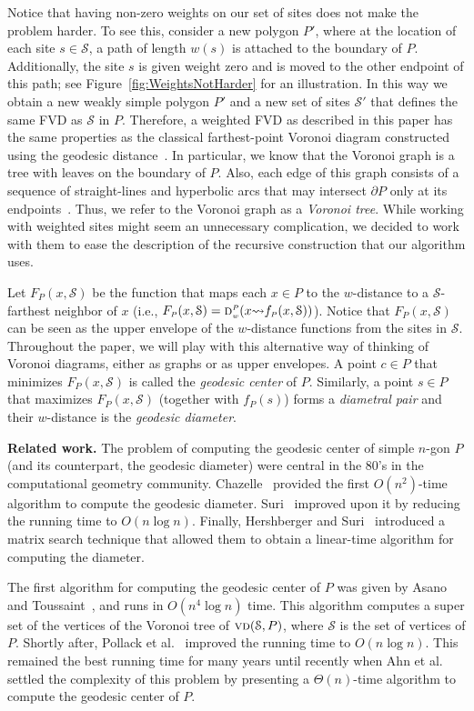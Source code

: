 \documentclass[a4paper,UKenglish]{socg-lipics-v2018}
\newcommand{\F}[2][P]{\ensuremath{F_{\scriptscriptstyle #1}(#2)}}
\newcommand{\s}{\mathcal S}
\newcommand{\dd}[3][P]{\ensuremath{\textsc{d}_{\scriptscriptstyle w}^{\scriptscriptstyle #1}(#2 {\leadsto} #3)}}
\newcommand{\f}[2][P]{\ensuremath{f_{\scriptscriptstyle #1}(#2)}}
\newcommand{\vd}[2][P]{\textsc{vd}(#2, #1)}
\begin{document}
Notice that having non-zero weights on our set of sites does not make the problem harder. 
To see this, consider a new polygon $P'$, where at the location of each site $s\in \s$, a path of length $w(s)$ is attached to the boundary of $P$. 
Additionally, the site $s$ is given weight zero and is moved to the other endpoint of this path; see Figure~\ref{fig:WeightsNotHarder} for an illustration. 
In this way we obtain a new weakly simple polygon $P'$ and a new set of sites $\s'$ that defines the same FVD as $\s$ in $P$. 
Therefore, a weighted FVD as described in this paper has the same properties as the classical farthest-point Voronoi diagram constructed using the geodesic distance~\cite{aronov1993furthest}. 
In particular, we know that the Voronoi graph is a tree with leaves on the boundary of $P$.
Also, each edge of this graph consists of a sequence of straight-lines and hyperbolic arcs that may intersect $\partial P$ only at its endpoints~\cite{aronov1993furthest}. 
Thus, we refer to the Voronoi graph as a \emph{Voronoi tree}.
While working with weighted sites might seem an unnecessary complication, we decided to work with them to ease the description of the recursive construction that our algorithm uses. 

Let $\F{x, \s}$ be the function that maps each $x\in P$ to the $w$-distance to a $\s$-farthest neighbor of $x$ (i.e., $\F{x, \s} = \dd{x}{\f{x, \s}}$).
Notice that $\F{x, \s}$ can be seen as the upper envelope of the $w$-distance functions from the sites in $\s$.
Throughout the paper, we will play with this alternative way of thinking of Voronoi diagrams, either as graphs or as upper envelopes.
A point $c\in P$ that minimizes $\F{x, \s}$ is called the \emph{geodesic center} of $P$. 
Similarly, a point $s\in P$ that maximizes $\F{x, \s}$ (together with $\f{s}$) forms a \emph{diametral pair} and their $w$-distance is the \emph{geodesic diameter}. 


\textbf{Related work.} 
The problem of computing the geodesic center of simple $n$-gon $P$ (and its counterpart, the geodesic diameter) were central in the 80's in the computational geometry community. 
Chazelle~\cite{c-tpca-82} provided the first $O(n^2)$-time algorithm to compute the geodesic diameter.
Suri~\cite{suri1989computing} improved upon it by reducing the running time to $O(n\log n)$. 
Finally, Hershberger and Suri~\cite{hershberger1993matrix} introduced a matrix search technique that allowed them to obtain a linear-time algorithm for computing the diameter.

The first algorithm for computing the geodesic center of $P$ was given by Asano and Toussaint~\cite{at-cgcsp-85}, and runs in $O(n^4\log n)$ time.  
This algorithm computes a super set of the vertices of the Voronoi tree of $\vd{\s}$, where $\s$ is the set of vertices of $P$.  
Shortly after, Pollack et al.~\cite{pollackComputingCenter} improved the running time to $O(n\log n)$.  
This remained the best running time for many years until recently when Ahn et al.~\cite{ahn2015linear} settled the complexity of this problem by presenting a $\Theta(n)$-time algorithm to compute the geodesic center of $P$. 
\end{document}
